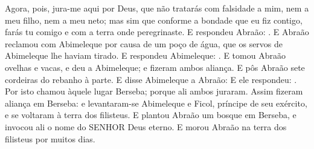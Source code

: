{{{  Agora, pois, jura-me aqui por Deus, que não tratarás com falsidade a mim, nem a meu filho, nem a meu neto; mas sim que conforme a bondade que eu fiz contigo, farás tu comigo e com a terra onde peregrinaste}.
  E respondeu Abraão: .
  E Abraão reclamou com Abimeleque por causa de um poço de água, que os servos de Abimeleque lhe haviam tirado.
  E respondeu Abimeleque: .
  E tomou Abraão ovelhas e vacas, e deu a Abimeleque; e fizeram ambos aliança.
  E pôs Abraão sete cordeiras do rebanho à parte.
  E disse Abimeleque a Abraão: 
  E ele respondeu: .
  Por isto chamou àquele
lugar Berseba; porque ali ambos juraram. %
  Assim fizeram aliança em Berseba: e levantaram-se Abimeleque e Ficol, príncipe de seu exército, e se voltaram à terra dos filisteus.
  E plantou Abraão um bosque em Berseba, e invocou ali o nome do SENHOR Deus eterno.
  E morou Abraão na terra dos filisteus por muitos dias.
\par }

}
